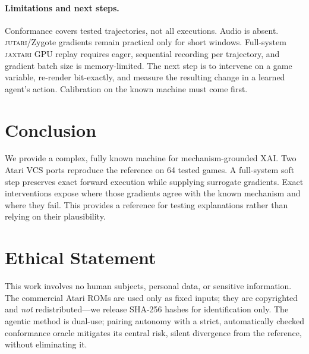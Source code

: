 \documentclass[letterpaper]{article} %
\begin{document}
\paragraph{Limitations and next steps.}
Conformance covers tested trajectories, not all
executions. Audio is absent. \textsc{jutari}/Zygote gradients remain practical
only for short windows. Full-system \textsc{jaxtari}
GPU replay requires eager, sequential recording per
trajectory, and gradient batch size is memory-limited. The next step is
to intervene on a game variable, re-render
bit-exactly, and measure the resulting change in
a learned agent's action. Calibration on the
known machine must come first.

\section{Conclusion}

We provide a complex, fully known machine for
mechanism-grounded XAI. Two Atari VCS ports
reproduce the reference on 64 tested games.
A full-system soft step preserves exact forward
execution while supplying surrogate gradients.
Exact interventions expose where those gradients
agree with the known mechanism and where they fail.
This provides a reference for testing explanations
rather than relying on their plausibility.

\section*{Ethical Statement}
This work involves no human subjects, personal data, or sensitive information. The
commercial Atari ROMs are used only as fixed inputs; they are copyrighted and
\emph{not} redistributed---we release SHA-256 hashes for identification only. The
agentic method is dual-use; pairing autonomy with a strict, automatically checked
conformance oracle mitigates its central risk, silent divergence from the
reference, without eliminating it.

{\small

}

%
\end{document}
